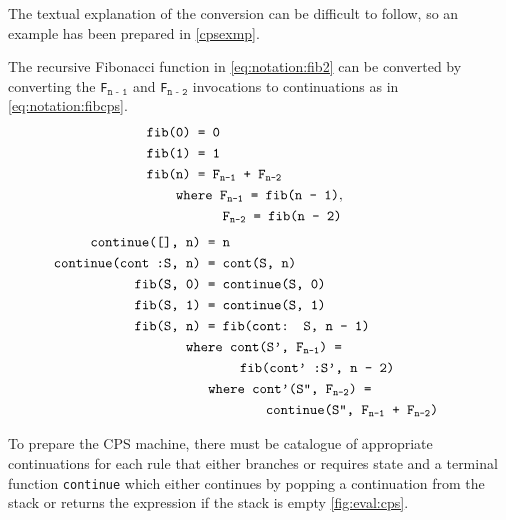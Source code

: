 The textual explanation of the conversion can be difficult to follow, so an example has been prepared in \autoref{cpsexmp}.
\begin{exmp}
	\label{cpsexmp}
	The recursive Fibonacci function in \autoref{eq:notation:fib2} can be converted by converting the \texttt{F}$_{\texttt{n - 1}}$ and \texttt{F}$_{\texttt{n - 2}}$ invocations to continuations as in \autoref{eq:notation:fibcps}.
	\begin{align}
		\texttt{fib(0) } & \texttt{= 0} \label{eq:notation:fib2}                  \\
		\texttt{fib(1) } & \texttt{= 1} \tag*{}                                   \\
		\texttt{fib(n) } & \texttt{= F$_\texttt{n-1}$ + F$_\texttt{n-2}$} \tag*{} \\
		\texttt{whe}&\texttt{re F$_\texttt{n-1}$ = fib(n - 1)},\tag*{}                         \\
		&\hspace{0.62cm}\texttt{F$_\texttt{n-2}$ = fib(n - 2)}\tag*{}
	\end{align}
	\begin{align}
		\texttt{continue([], n) }      & \texttt{= n} \label{eq:notation:fibcps}  \\
		\texttt{continue(cont :S, n) } & \texttt{= cont(S, n)} \tag*{}            \\
		\texttt{fib(S, 0) }            & \texttt{= continue(S, 0)} \tag*{}        \\
		\texttt{fib(S, 1) }            & \texttt{= continue(S, 1)} \tag*{}        \\
		\texttt{fib(S, n) }            & \texttt{= fib(cont: S, n - 1)} \tag*{}   \\
		\wherecase{cont(S', F$_\texttt{n-1}$) =}\tag*{}                           \\
		\extracase{ fib(cont' :S', n - 2)}\tag*{}                                 \\
		\extracase{ \hspace*{-0.8cm}where cont'(S'', F$_\texttt{n-2}$) = }\tag*{} \\
		\extracase{\hspace*{0.65cm} continue(S'', F$_\texttt{n-1}$ + F$_\texttt{n-2}$)}\tag*{}
	\end{align}
\end{exmp}
To prepare the CPS machine, there must be catalogue of appropriate continuations for each rule that either branches or requires state and a terminal function \texttt{continue} which either continues by popping a continuation from the stack or returns the expression if the stack is empty \autoref{fig:eval:cps}.
